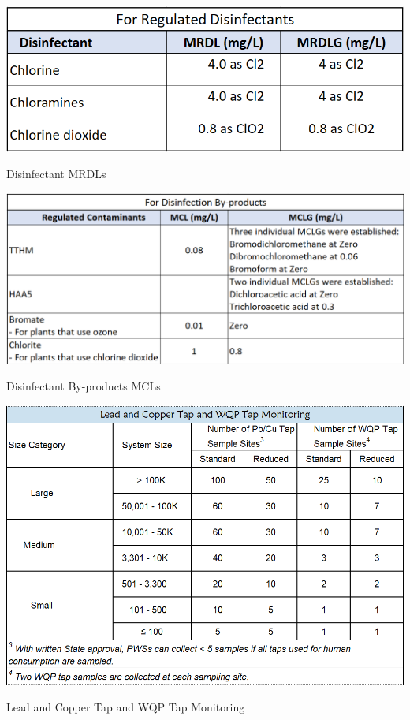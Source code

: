 \documentclass{article}
\begin{document}
\newpage
\begin{table}[]
\begin{center}
\includegraphics[scale=0.5]{DinfectantMRDLS}
\caption{Disinfectant MRDLs}
\label{table:DisinfectantMRDLs}
\end{center}
\end{table}
\begin{table}[]
\begin{center}
\includegraphics[scale=0.5]{DBPMCLS}
\caption{Disinfectant By-products MCLs}
\label{table:DBPMCL}
\end{center}
\end{table}

\newpage
\begin{table}[H]
\begin{center}
\includegraphics[scale=0.5]{LCRMonitoring}
\caption{Lead and Copper Tap and WQP Tap Monitoring}
\end{center}
\end{table}
\newpage
\end{document}
